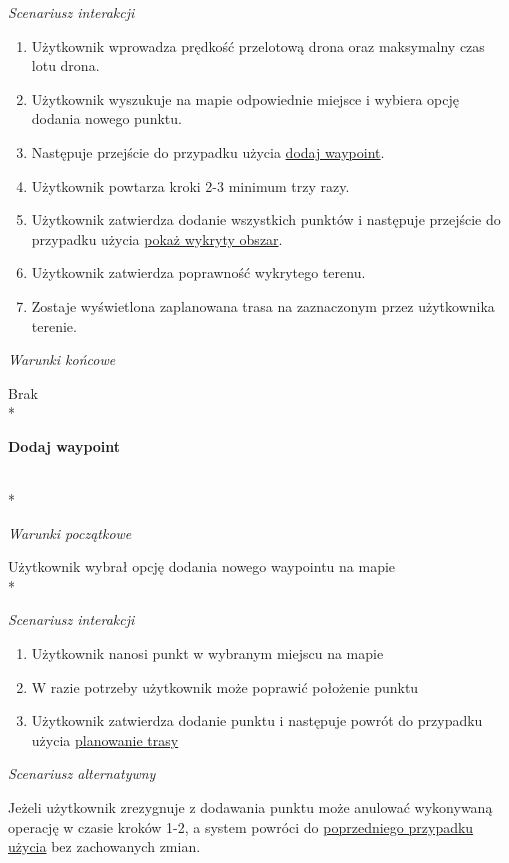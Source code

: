 \textit{Scenariusz interakcji}
\begin{enumerate}
    \item Użytkownik wprowadza prędkość przelotową drona oraz maksymalny czas lotu drona.
    \item Użytkownik wyszukuje na mapie odpowiednie miejsce i wybiera opcję dodania nowego punktu.
    \item Następuje przejście do przypadku użycia \hyperlink{add waypoint}{dodaj waypoint}.
    \item Użytkownik powtarza kroki 2-3 minimum trzy razy.
    \item Użytkownik zatwierdza dodanie wszystkich punktów i następuje przejście do przypadku użycia \hyperlink{show detected area}{pokaż wykryty obszar}.
    \item Użytkownik zatwierdza poprawność wykrytego terenu.
    \item Zostaje wyświetlona zaplanowana trasa na zaznaczonym przez użytkownika terenie.
\end{enumerate}

\vspace{\baselineskip}
\textit{Warunki końcowe}

Brak \\*

\hypertarget{add waypoint}{\textbf{Dodaj waypoint}} \\*

\textit{Warunki początkowe}

Użytkownik wybrał opcję dodania nowego waypointu na mapie \\*

\textit{Scenariusz interakcji}
\begin{enumerate}
    \item Użytkownik nanosi punkt w wybranym miejscu na mapie
    \item W razie potrzeby użytkownik może poprawić położenie punktu
    \item Użytkownik zatwierdza dodanie punktu i następuje powrót do przypadku użycia \hyperlink{plan route}{planowanie trasy}
\end{enumerate}

\vspace{\baselineskip}
\textit{Scenariusz alternatywny}

\begin{adjustwidth}{1.5em}{}
Jeżeli użytkownik zrezygnuje z dodawania punktu może anulować wykonywaną operację w czasie kroków 1-2, a system powróci do \hyperlink{plan route}{poprzedniego przypadku użycia} bez zachowanych zmian.   
\end{adjustwidth}

